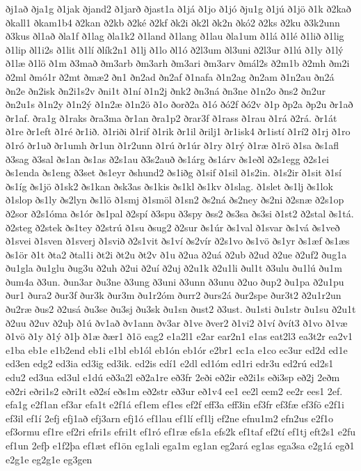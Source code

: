{ðj1að
ðja1g
ð1jak
ðjand2
ð1jarð
ðjast1a
ð1já
ð1jo
ð1jó
ðju1g
ð1jú
ð1jö
ð1k
ð2kað
ðkall1
ðkam1b4
ð2kan
ð2kb
ð2ké
ð2kf
ðk2i
ðk2l
ðk2n
ðkó2
ð2ks
ð2ku
ð3k2unn
ð3kus
ðl1að
ðla1f
ð1lag
ðla1k2
ð1land
ð1lang
ð1lau
ðla1um
ð1lá
ð1lé
ð1lið
ð1lig
ð1lip
ðl1i2s
ð1lit
ð1lí
ðlík2n1
ð1lj
ð1lo
ðl1ó
ð2l3um
ðl3uni
ð2l3ur
ð1lú
ð1ly
ð1lý
ð1læ
ð1lö
ð1m
ð3mað
ðm3arb
ðm3arh
ðm3ari
ðm3arv
ðmál2s
ð2m1b
ð2mh
ðm2i
ð2ml
ðmó1r
ð2mt
ðmæ2
ðn1
ðn2ad
ðn2af
ð1nafa
ð1n2ag
ðn2am
ð1n2au
ðn2á
ðn2e
ðn2isk
ðn2i1s2v
ðni1t
ð1ní
ð1n2j
ðnk2
ðn3ná
ðn3ne
ð1n2o
ðns2
ðn2ur
ðn2u1s
ð1n2y
ð1n2ý
ð1n2æ
ð1n2ö
ð1o
ðorð2a
ð1ó
ðó2f
ðó2v
ð1p
ðp2a
ðp2u
ðr1að
ðr1af.
ðra1g
ð1raks
ðra3ma
ðr1an
ðra1p2
ðrar3f
ð1rass
ð1rau
ð1rá
ð2rá.
ðr1át
ð1re
ðr1eft
ð1ré
ðr1ið.
ð1riði
ð1rif
ð1rik
ðr1il
ðrilj1
ðr1isk4
ðr1istí
ð1rí2
ð1rj
ð1ro
ð1ró
ðr1uð
ðr1umh
ðr1un
ð1r2unn
ð1rú
ðr1úr
ð1ry
ð1rý
ð1ræ
ð1rö
ð1sa
ðs1afl
ð3sag
ð3sal
ðs1an
ðs1as
ð2s1au
ð3s2auð
ðs1árg
ðs1árv
ðs1eðl
ð2s1egg
ð2s1ei
ðs1enda
ðs1eng
ð3set
ðs1eyr
ðshund2
ðs1iðg
ð1sif
ð1sil
ð1s2in.
ð1s2ir
ð1sit
ð1sí
ðs1íg
ðs1jö
ð1sk2
ðs1kan
ðsk3as
ðs1kis
ðs1kl
ðs1kv
ð1slag.
ð1slet
ðs1lj
ðs1lok
ð1slop
ðs1ly
ðs2lyn
ðs1lö
ð1smj
ð1smöl
ð1sn2
ðs2ná
ðs2ney
ðs2ni
ð2snæ
ð2s1op
ð2sor
ð2s1óma
ðs1ór
ðs1pal
ð2spí
ð3spu
ð3spy
ðss2
ðs3sa
ðs3si
ð1st2
ð2stal
ðs1tá.
ð2steg
ð2stek
ðs1tey
ð2strú
ð1su
ðsug2
ð2sur
ðs1úr
ðs1val
ð1svar
ðs1vá
ðs1veð
ð1svei
ð1sven
ð1sverj
ð1svið
ð2s1vit
ðs1ví
ðs2vír
ð2s1vo
ðs1vö
ðs1yr
ðs1æf
ðs1æs
ðs1ör
ð1t
ðta2
ðtal1i
ðt2i
ðt2u
ðt2v
ð1u
ð2ua
ð2uá
ð2ub
ð2ud
ð2ue
ð2uf2
ðug1a
ðu1gla
ðu1glu
ðug3u
ð2uh
ð2ui
ð2uí
ð2uj
ð2u1k
ð2u1li
ðul1t
ð3ulu
ðu1lú
ðu1m
ðum4a
ð3un.
ðun3ar
ðu3ne
ð3ung
ð3uni
ð3unn
ð3unu
ð2uo
ðup2
ðu1pa
ð2u1pu
ður1
ðura2
ður3f
ður3k
ður3m
ðu1r2óm
ðurr2
ðurs2á
ður2spe
ður3t2
ð2u1r2un
ðu2ræ
ðus2
ð2usá
ðu3se
ðu3sj
ðu3sk
ðu1sn
ðust2
ð3ust.
ðu1sti
ðu1str
ðu1su
ð2u1t
ð2uu
ð2uv
ð2uþ
ð1ú
ðv1að
ðv1ann
ðv3ar
ð1ve
ðver2
ð1vi2
ð1ví
ðvít3
ð1vo
ð1væ
ð1vö
ð1y
ð1ý
ð1þ
ð1æ
ðær1
ð1ö
eag2
e1a2l1
e2ar
ear2n1
e1as
eat2l3
ea3t2r
ea2v1
e1ba
eb1e
e1b2end
eb1i
e1bl
eb1ól
eb1ón
eb1ór
e2br1
ec1a
e1co
ec3ur
ed2d
ed1e
ed3en
edg2
ed3ia
ed3ig
ed3ik.
ed2is
edí1
e2dl
ed1óm
ed1ri
edr3u
ed2rú
ed2s1
edu2
ed3ua
ed3ul
e1dú
eð3a2l
eð2a1re
eð3fr
2eði
eð2ir
eð2i1s
eði3sp
eð2j
2eðm
eð2ri
eðri1s2
eðri1t
eð2sí
eðs1m
eð2str
eð3ur
eð1v4
ee1
ee2l
eem2
ee2r
ees1
2ef.
efa1g
e2f1an
ef3ar
efa1t
e2f1á
ef1em
ef1es
ef2f
eff3a
eff3in
ef3fr
ef3fæ
ef3fö
e2f1i
ef3il
ef1í
2efj
efj1að
efj3arn
efj1ó
ef1lau
ef1lí
ef1lj
ef2ne
efnu1m2
efn2us
e2f1o
ef3ormu
ef1re
ef2ri
efri1s
efri1t
ef1ró
ef1ræ
efs1a
efs2k
ef1taf
ef2tí
ef1tj
eft2s1
e2fu
ef1un
2efþ
e1f2þa
ef1æt
ef1ön
eg1ali
ega1m
eg1an
eg2ará
eg1as
ega3sa
e2g1á
egð1
e2g1e
eg2g1e
eg3gen
}
